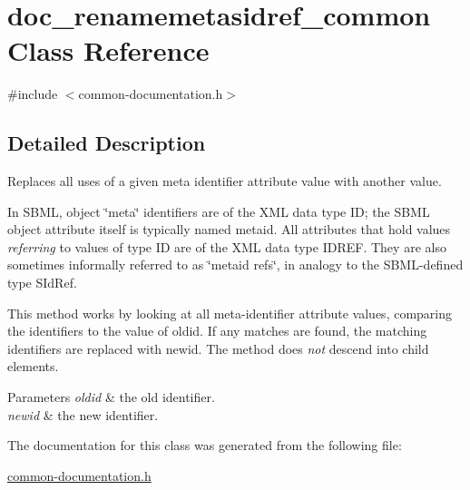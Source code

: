 \hypertarget{classdoc__renamemetasidref__common}{}\section{doc\+\_\+renamemetasidref\+\_\+common Class Reference}
\label{classdoc__renamemetasidref__common}


{\ttfamily \#include $<$common-\/documentation.\+h$>$}



\subsection{Detailed Description}
Replaces all uses of a given meta identifier attribute value with another value.

\begin{DoxyParagraph}{}
In S\+B\+ML, object \char`\"{}meta\char`\"{} identifiers are of the X\+ML data type {\ttfamily ID}; the S\+B\+ML object attribute itself is typically named {\ttfamily metaid}. All attributes that hold values {\itshape referring} to values of type {\ttfamily ID} are of the X\+ML data type {\ttfamily I\+D\+R\+EF}. They are also sometimes informally referred to as \char`\"{}metaid refs\char`\"{}, in analogy to the S\+B\+M\+L-\/defined type {\ttfamily S\+Id\+Ref}.
\end{DoxyParagraph}
This method works by looking at all meta-\/identifier attribute values, comparing the identifiers to the value of {\ttfamily oldid}. If any matches are found, the matching identifiers are replaced with {\ttfamily newid}. The method does {\itshape not} descend into child elements.


\begin{DoxyParams}{Parameters}
{\em oldid} & the old identifier. \\
\hline
{\em newid} & the new identifier. \\
\hline
\end{DoxyParams}


The documentation for this class was generated from the following file\+:\begin{DoxyCompactItemize}
\item 
\hyperlink{common-documentation_8h}{common-\/documentation.\+h}\end{DoxyCompactItemize}
